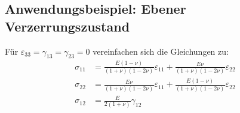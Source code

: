 \subsection{Anwendungsbeispiel: Ebener Verzerrungszustand}
Für \(\varepsilon_{33} = \gamma_{13} = \gamma_{23} = 0\) vereinfachen sich die Gleichungen zu:
\begin{align}
	\sigma_{11} &=	\frac{E (1-\nu)}{(1+\nu)(1-2\nu)} \varepsilon_{11} + \frac{E \nu}{(1+\nu)(1-2\nu)} \varepsilon_{22}
	\\
	\sigma_{22} &=	\frac{E \nu}{(1+\nu)(1-2\nu)} \varepsilon_{11} + \frac{E (1-\nu)}{(1+\nu)(1-2\nu)} \varepsilon_{22}
	\\
	\sigma_{12} &=	\frac{E}{2(1+\nu)} \gamma_{12}
\end{align}
